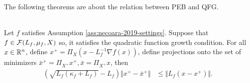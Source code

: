 \documentclass[12pt]{report}
\begin{document}
            \par
            The following theorems are about the relation between PEB and QFG.
            \begin{lemma}\;\label{lemma:grad-map-qfg}\\
                Let $f$ satisfies Assumption \ref{ass:necoara-2019-settings}.
                Suppose that $f \in \mathcal F(L_f, \mu_f, X)$ so, it satisfies the quadratic function growth condition. 
                For all $x \in \mathbb R^n$, define $x^+ = \Pi_X(x - L^{-1}_f\nabla f(x))$, 
                define projections onto the set of minimizers $\bar x^+ = \Pi_{X^+} x^+, \bar x = \Pi_{X^+}x$, then
                \begin{align*}
                    \left(
                        \sqrt{L_f(\kappa_f + L_f)} - L_f
                    \right)\Vert x^+ - \bar x^+\Vert
                    &\le \Vert L_f(x - x^+)\Vert. 
                \end{align*}
            \end{lemma}
\end{document}
